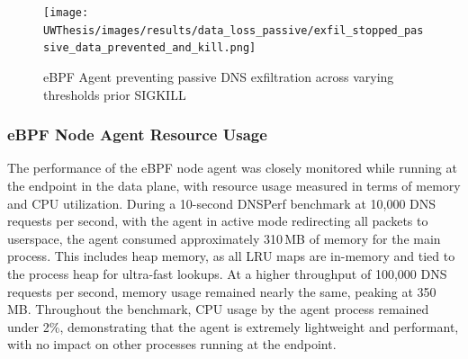 \documentclass [11pt, proquest] {uwthesis}[2020/02/24]
\begin{document}
\begin{figure}[H]
  \centering
  \texttt{[image: UWThesis/images/results/data\_loss\_passive/exfil\_stopped\_passive\_data\_prevented\_and\_kill.png]}
\caption{eBPF Agent preventing passive DNS exfiltration across varying thresholds prior SIGKILL}
  \label{fig:data_loss_prev}
\end{figure}



\subsubsection{eBPF Node Agent Resource Usage}
The performance of the eBPF node agent was closely monitored while running at the endpoint in the data plane, with resource usage measured in terms of memory and CPU utilization. During a 10-second DNSPerf benchmark at 10,000 DNS requests per second, with the agent in active mode redirecting all packets to userspace, the agent consumed approximately 310 MB of memory for the main process. This includes heap memory, as all LRU maps are in-memory and tied to the process heap for ultra-fast lookups. At a higher throughput of 100,000 DNS requests per second, memory usage remained nearly the same, peaking at 350 MB. Throughout the benchmark, CPU usage by the agent process remained under 2\%, demonstrating that the agent is extremely lightweight and performant, with no impact on other processes running at the endpoint.
\end{document}
